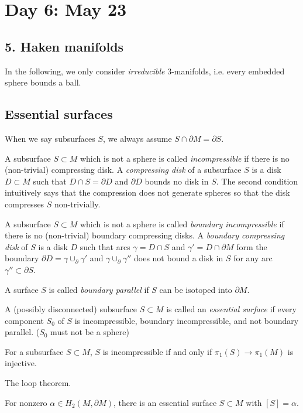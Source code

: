 \documentclass{../../../small}
\begin{document}
\newpage
\setcounter{section}{5}
\section{Day 6: May 23}
\setcounter{section}{5}
\subsection*{5. Haken manifolds}
In the following, we only consider \emph{irreducible} 3-manifolds, i.e. every embedded sphere bounds a ball.

\subsection{Essential surfaces}
When we say subsurfaces $S$, we always assume $S\cap\partial M=\partial S$.

A subsurface $S\subset M$ which is not a sphere is called \emph{incompressible} if there is no (non-trivial) compressing disk.
A \emph{compressing disk} of a subsurface $S$ is a disk $D\subset M$ such that $D\cap S=\partial D$ and $\partial D$ bounds no disk in $S$.
The second condition intuitively says that the compression does not generate spheres so that the disk compresses $S$ non-trivially.

A subsurface $S\subset M$ which is not a sphere is called \emph{boundary incompressible} if there is no (non-trivial) boundary compressing disks.
A \emph{boundary compressing disk} of $S$ is a disk $D$ such that arcs $\gamma=D\cap S$ and $\gamma'=D\cap\partial M$ form the boundary $\partial D=\gamma\cup_\partial\gamma'$ and $\gamma\cup_\partial\gamma''$ does not bound a disk in $S$ for any arc $\gamma''\subset\partial S$.

A surface $S$ is called \emph{boundary parallel} if $S$ can be isotoped into $\partial M$.

A (possibly disconnected) subsurface $S\subset M$ is called an \emph{essential surface} if every component $S_0$ of $S$ is incompressible, boundary incompressible, and not boundary parallel. ($S_0$ must not be a sphere)

\begin{prop}
For a subsurface $S\subset M$, $S$ is incompressible if and only if $\pi_1(S)\to\pi_1(M)$ is injective.
\end{prop}
\begin{pf}
The loop theorem.
\end{pf}
\begin{prop}
For nonzero $\alpha\in H_2(M,\partial M)$, there is an essential surface $S\subset M$ with $[S]=\alpha$.
\end{prop}
\end{document}
